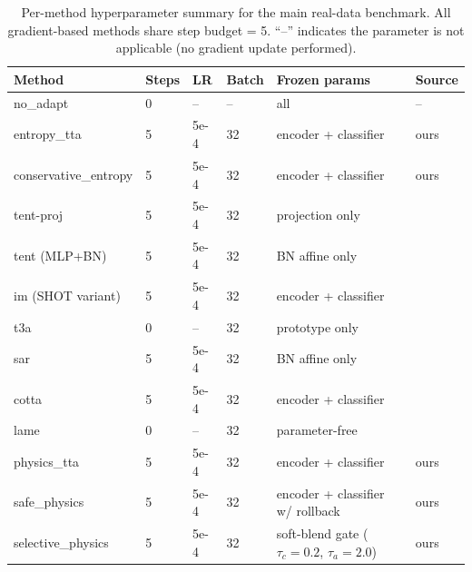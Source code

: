 \begin{table}[h]
\centering
\footnotesize
\begin{tabular}{llllll}
\toprule
\textbf{Method} & \textbf{Steps} & \textbf{LR} & \textbf{Batch} & \textbf{Frozen params} & \textbf{Source} \\
\midrule
no\_adapt             & 0  & --    & --  & all                                          & --                       \\
entropy\_tta          & 5 & 5e-4  & 32  & encoder + classifier                         & ours                     \\
conservative\_entropy & 5 & 5e-4  & 32  & encoder + classifier                         & ours                     \\
tent-proj             & 5 & 5e-4  & 32  & projection only                              & \cite{wang2021tent}      \\
tent (MLP+BN)         & 5 & 5e-4  & 32  & BN affine only                               & \cite{wang2021tent}      \\
im (SHOT variant)     & 5 & 5e-4  & 32  & encoder + classifier                         & \cite{liang2020shot}     \\
t3a                   & 0  & --    & 32  & prototype only                               & \cite{iwasawa2021t3a}    \\
sar                   & 5 & 5e-4  & 32  & BN affine only                               & \cite{niu2023sar}        \\
cotta                 & 5 & 5e-4  & 32  & encoder + classifier                         & \cite{wang2022cotta}     \\
lame                  & 0  & --    & 32  & parameter-free                               & \cite{boudiaf2022lame}   \\
physics\_tta          & 5 & 5e-4  & 32  & encoder + classifier                         & ours                     \\
safe\_physics         & 5 & 5e-4  & 32  & encoder + classifier w/ rollback             & ours                     \\
selective\_physics    & 5 & 5e-4  & 32  & soft-blend gate ($\tau_c{=}0.2$, $\tau_a{=}2.0$) & ours              \\
\bottomrule
\end{tabular}
\caption{Per-method hyperparameter summary for the main real-data benchmark. All gradient-based methods share step budget = 5.
  ``--'' indicates the parameter is not applicable (no gradient update performed).}
\label{tab:hyperparams_fairness}
\end{table}

